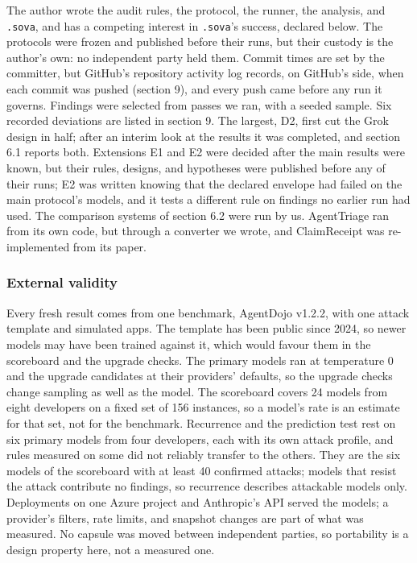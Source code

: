 \documentclass[
  american,
  10pt,
  a4paper,
]{article}
\begin{document}
The author wrote the audit rules, the protocol, the runner, the
analysis, and \texttt{.sova}, and has a competing interest in
\texttt{.sova}'s success, declared below. The protocols were frozen and
published before their runs, but their custody is the author's own: no
independent party held them. Commit times are set by the committer, but
GitHub's repository activity log records, on GitHub's side, when each
commit was pushed (section 9), and every push came before any run it
governs. Findings were selected from passes we ran, with a seeded
sample. Six recorded deviations are listed in section 9. The largest,
D2, first cut the Grok design in half; after an interim look at the
results it was completed, and section 6.1 reports both. Extensions E1
and E2 were decided after the main results were known, but their rules,
designs, and hypotheses were published before any of their runs; E2 was
written knowing that the declared envelope had failed on the main
protocol's models, and it tests a different rule on findings no earlier
run had used. The comparison systems of section 6.2 were run by us.
AgentTriage ran from its own code, but through a converter we wrote, and
ClaimReceipt was re-implemented from its paper.

\subsubsection{External validity}\label{external-validity}

Every fresh result comes from one benchmark, AgentDojo v1.2.2, with one
attack template and simulated apps. The template has been public since
2024, so newer models may have been trained against it, which would
favour them in the scoreboard and the upgrade checks. The primary models
ran at temperature 0 and the upgrade candidates at their providers'
defaults, so the upgrade checks change sampling as well as the model.
The scoreboard covers 24 models from eight developers on a fixed set of
156 instances, so a model's rate is an estimate for that set, not for
the benchmark. Recurrence and the prediction test rest on six primary
models from four developers, each with its own attack profile, and rules
measured on some did not reliably transfer to the others. They are the
six models of the scoreboard with at least 40 confirmed attacks; models
that resist the attack contribute no findings, so recurrence describes
attackable models only. Deployments on one Azure project and Anthropic's
API served the models; a provider's filters, rate limits, and snapshot
changes are part of what was measured. No capsule was moved between
independent parties, so portability is a design property here, not a
measured one.
\end{document}
